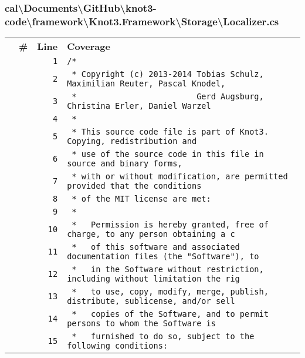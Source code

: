 \documentclass[a4paper,10pt]{article}
\begin{document}
\subsubsection{cal\textbackslash Documents\textbackslash GitHub\textbackslash knot3-code\textbackslash framework\textbackslash Knot3.Framework\textbackslash Storage\textbackslash Localizer.cs}
\begin{longtable}[l]{lrrl}
\textbf{} & \textbf{\#} & \textbf{Line} & \textbf{Coverage}\\
\cellcolor{gray} &  & \verb~1~ & \verb~/*~\\
\cellcolor{gray} &  & \verb~2~ & \verb~ * Copyright (c) 2013-2014 Tobias Schulz, Maximilian Reuter, Pascal Knodel,~\\
\cellcolor{gray} &  & \verb~3~ & \verb~ *                         Gerd Augsburg, Christina Erler, Daniel Warzel~\\
\cellcolor{gray} &  & \verb~4~ & \verb~ *~\\
\cellcolor{gray} &  & \verb~5~ & \verb~ * This source code file is part of Knot3. Copying, redistribution and~\\
\cellcolor{gray} &  & \verb~6~ & \verb~ * use of the source code in this file in source and binary forms,~\\
\cellcolor{gray} &  & \verb~7~ & \verb~ * with or without modification, are permitted provided that the conditions~\\
\cellcolor{gray} &  & \verb~8~ & \verb~ * of the MIT license are met:~\\
\cellcolor{gray} &  & \verb~9~ & \verb~ *~\\
\cellcolor{gray} &  & \verb~10~ & \verb~ *   Permission is hereby granted, free of charge, to any person obtaining a c~\\
\cellcolor{gray} &  & \verb~11~ & \verb~ *   of this software and associated documentation files (the "Software"), to ~\\
\cellcolor{gray} &  & \verb~12~ & \verb~ *   in the Software without restriction, including without limitation the rig~\\
\cellcolor{gray} &  & \verb~13~ & \verb~ *   to use, copy, modify, merge, publish, distribute, sublicense, and/or sell~\\
\cellcolor{gray} &  & \verb~14~ & \verb~ *   copies of the Software, and to permit persons to whom the Software is~\\
\cellcolor{gray} &  & \verb~15~ & \verb~ *   furnished to do so, subject to the following conditions:~\\

\end{longtable}
\end{document}
